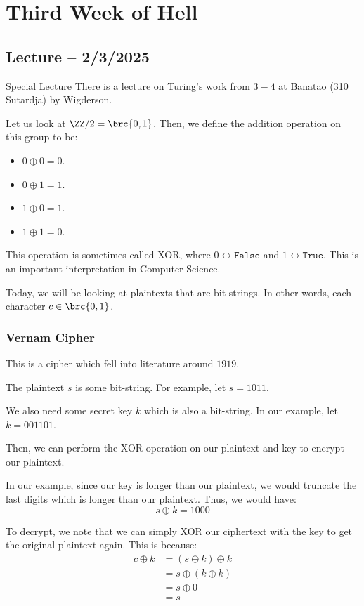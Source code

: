 \documentclass[openany]{book}
\begin{document}
\chapter{Third Week of Hell}
\section{Lecture -- 2/3/2025}
\begin{miscbox}{Special Lecture}
	There is a lecture on Turing's work from $3-4$ at Banatao (310 Sutardja) by Wigderson.
\end{miscbox}

Let us look at $\ZZ/2 = \brc{0, 1}$. Then, we define the addition operation on this group to be:
\begin{itemize}
	\item $0 \oplus 0 = 0$.
	\item $0 \oplus 1 = 1$.
	\item $1 \oplus 0 = 1$.
	\item $1 \oplus 1 = 0$.
\end{itemize}

This operation is sometimes called XOR, where $0 \leftrightarrow \texttt{False}$ and $1 \leftrightarrow \texttt{True}$. This is an important interpretation in Computer Science.

Today, we will be looking at plaintexts that are bit strings. In other words, each character $c \in \brc{0,1}$.

\subsection{Vernam Cipher}
This is a cipher which fell into literature around $1919$.

\begin{example}
	The plaintext $s$ is some bit-string. For example, let $s = 1011$.
	
	We also need some secret key $k$ which is also a bit-string. In our example, let $k = 001101$.
	
	Then, we can perform the XOR operation on our plaintext and key to encrypt our plaintext.
	
	In our example, since our key is longer than our plaintext, we would truncate the last digits which is longer than our plaintext. Thus, we would have:
	\begin{equation*}
		s \oplus k = 1000
	\end{equation*}
	
	To decrypt, we note that we can simply XOR our ciphertext with the key to get the original plaintext again. This is because:
	\begin{align*}
		c \oplus k &= (s \oplus k) \oplus k \\
		&= s \oplus (k \oplus k) \\
		&= s \oplus 0 \\
		&= s
	\end{align*}
\end{example}
\end{document}
